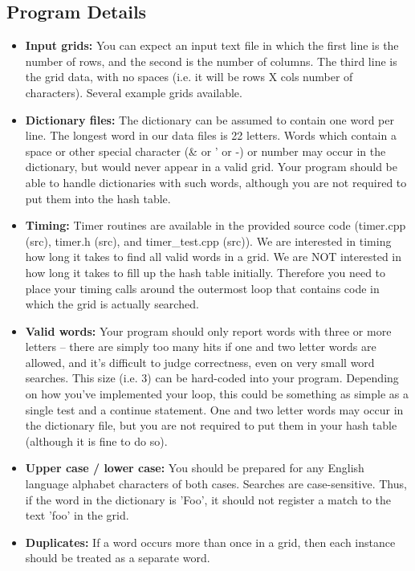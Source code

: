 \documentclass[11pt]{article}
\begin{document}
\subsection*{Program Details}
\begin{itemize}
\item \textbf{Input grids:} You can expect an input text file in which the first line is the number of rows, and the second is the number of columns. The third line is the grid data, with no spaces (i.e. it will be rows X cols number of characters). Several example grids available. 

\item \textbf{Dictionary files:} The dictionary can be assumed to contain one word per line. The longest word in our data files is 22 letters. Words which contain a space or other special character (\& or ' or -) or number may occur in the dictionary, but would never appear in a valid grid. Your program should be able to handle dictionaries with such words, although you are not required to put them into the hash table.

\item \textbf{Timing:} Timer routines are available in the provided source code (timer.cpp (src), timer.h (src), and timer\_test.cpp (src)). We are interested in timing how long it takes to find all valid words in a grid. We are NOT interested in how long it takes to fill up the hash table initially. Therefore you need to place your timing calls around the outermost loop that contains code in which the grid is actually searched.

\item \textbf{Valid words:} Your program should only report words with three or more letters -- there are simply too many hits if one and two letter words are allowed, and it's difficult to judge correctness, even on very small word searches. This size (i.e. 3) can be hard-coded into your program. Depending on how you've implemented your loop, this could be something as simple as a single test and a continue statement. One and two letter words may occur in the dictionary file, but you are not required to put them in your hash table (although it is fine to do so).

\item \textbf{Upper case / lower case:} You should be prepared for any English language alphabet characters of both cases. Searches are case-sensitive. Thus, if the word in the dictionary is 'Foo', it should not register a match to the text 'foo' in the grid.

\item \textbf{Duplicates:} If a word occurs more than once in a grid, then each instance should be treated as a separate word.
\end{itemize}
\end{document}
